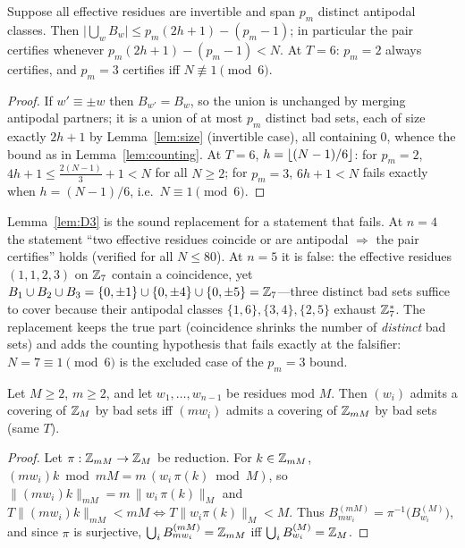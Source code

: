 \begin{lemma}\label{lem:D3}
Suppose all effective residues are invertible and span $p_m$ distinct
antipodal classes. Then
$\bigl|\bigcup_w B_w\bigr|\le p_m(2h+1)-(p_m-1)$; in particular the pair
certifies whenever $p_m(2h+1)-(p_m-1)<N$. At $T=6$: $p_m=2$ always
certifies, and $p_m=3$ certifies iff $N\not\equiv 1\pmod 6$.
\end{lemma}

\begin{proof}
If $w'\equiv\pm w$ then $B_{w'}=B_w$, so the union is unchanged by merging
antipodal partners; it is a union of at most $p_m$ distinct bad sets, each
of size exactly $2h+1$ by Lemma~\ref{lem:size} (invertible case), all
containing $0$, whence the bound as in Lemma~\ref{lem:counting}. At $T=6$,
$h=\left\lfloor (N-1)/6 \right\rfloor$: for $p_m=2$,
$4h+1\le\tfrac{2(N-1)}{3}+1<N$ for all $N\ge 2$; for $p_m=3$,
$6h+1<N$ fails exactly when $h=(N-1)/6$, i.e.\ $N\equiv1\pmod 6$.
\end{proof}

Lemma~\ref{lem:D3} is the sound replacement for a statement that fails.
At $n=4$ the statement ``two effective
residues coincide or are antipodal $\Rightarrow$ the pair certifies'' holds
(verified for all $N\le 80$). At $n=5$ it is false: the effective residues
$(1,1,2,3)$ on $\mathbb{Z}_7$ contain a coincidence, yet
$B_1\cup B_2\cup B_3=\{0,\pm1\}\cup\{0,\pm4\}\cup\{0,\pm5\}=\mathbb{Z}_7$---three
distinct bad sets suffice to cover because their antipodal classes
$\{1,6\},\{3,4\},\{2,5\}$ exhaust $\mathbb{Z}_7^\ast$. The replacement keeps the
true part (coincidence shrinks the number of \emph{distinct} bad sets) and
adds the counting hypothesis that fails exactly at the falsifier:
$N=7\equiv 1 \pmod 6$ is the excluded case of the $p_m=3$ bound.

\begin{lemma}\label{lem:lift}
Let $M\ge 2$, $m\ge 2$, and let $w_1,\dots,w_{n-1}$ be residues mod $M$.
Then $(w_i)$ admits a covering of $\mathbb{Z}_M$ by bad sets iff
$(mw_i)$ admits a covering of $\mathbb{Z}_{mM}$ by bad sets (same $T$).
\end{lemma}

\begin{proof}
Let $\pi:\mathbb{Z}_{mM}\to\mathbb{Z}_M$ be reduction. For $k\in\mathbb{Z}_{mM}$,
$(mw_i)k\bmod mM=m\,(w_i\,\pi(k)\bmod M)$, so
$\lVert (mw_i)k\rVert_{mM}=m\,\lVert w_i\,\pi(k)\rVert_{M}$ and
$T\lVert (mw_i)k\rVert_{mM}<mM\iff T\lVert w_i\pi(k)\rVert_{M}<M$. Thus
$B^{(mM)}_{mw_i}=\pi^{-1}\bigl(B^{(M)}_{w_i}\bigr)$, and since $\pi$ is
surjective, $\bigcup_i B^{(mM)}_{mw_i}=\mathbb{Z}_{mM}$ iff
$\bigcup_i B^{(M)}_{w_i}=\mathbb{Z}_M$.
\end{proof}

